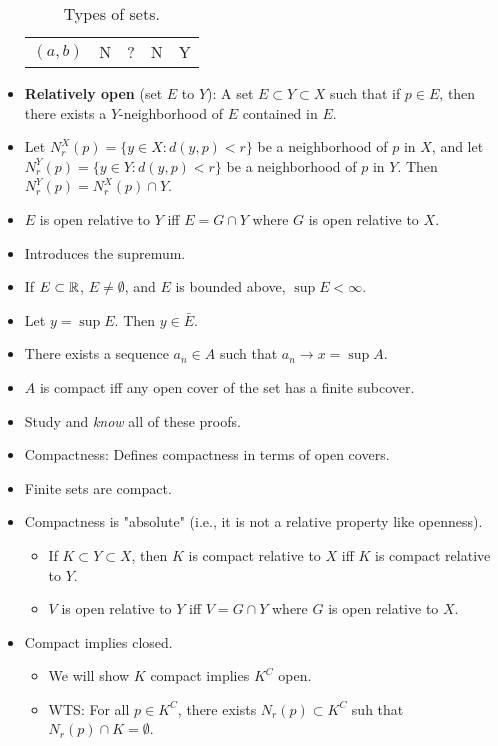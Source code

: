 \documentclass[../../notes.tex]{subfiles}
\begin{document}
\begin{itemize}
\begin{table}[h!]
\begin{tabular}{l|c|c|c|c}
            $(a,b)$ & N & ? & N & Y\\
        \end{tabular}
        \caption{Types of sets.}
        \label{tab:typesSets}
    \end{table}
    \item \textbf{Relatively open} (set $E$ to $Y$): A set $E\subset Y\subset X$ such that if $p\in E$, then there exists a $Y$-neighborhood of $E$ contained in $E$.
    \item Let $N_r^X(p)=\{y\in X:d(y,p)<r\}$ be a neighborhood of $p$ in $X$, and let $N_r^Y(p)=\{y\in Y:d(y,p)<r\}$ be a neighborhood of $p$ in $Y$. Then $N_r^Y(p)=N_r^X(p)\cap Y$.
    \item $E$ is open relative to $Y$ iff $E=G\cap Y$ where $G$ is open relative to $X$.
    \item Introduces the supremum.
    \item If $E\subset\mathbb{R}$, $E\neq\emptyset$, and $E$ is bounded above, $\sup E<\infty$.
    \item Let $y=\sup E$. Then $y\in\bar{E}$.
    \item There exists a sequence $a_n\in A$ such that $a_n\to x=\sup A$.
    \item $A$ is compact iff any open cover of the set has a finite subcover.
    \item Study and \emph{know} all of these proofs.
    \item {}Compactness: Defines compactness in terms of open covers.
    \item Finite sets are compact.
    \item Compactness is "absolute" (i.e., it is not a relative property like openness).
    \begin{itemize}
        \item If $K\subset Y\subset X$, then $K$ is compact relative to $X$ iff $K$ is compact relative to $Y$.
        \item $V$ is open relative to $Y$ iff $V=G\cap Y$ where $G$ is open relative to $X$.
    \end{itemize}
    \item Compact implies closed.
    \begin{itemize}
        \item We will show $K$ compact implies $K^C$ open.
        \item WTS: For all $p\in K^C$, there exists $N_r(p)\subset K^C$ suh that $N_r(p)\cap K=\emptyset$.
    \end{itemize}

\end{itemize}
\end{document}
